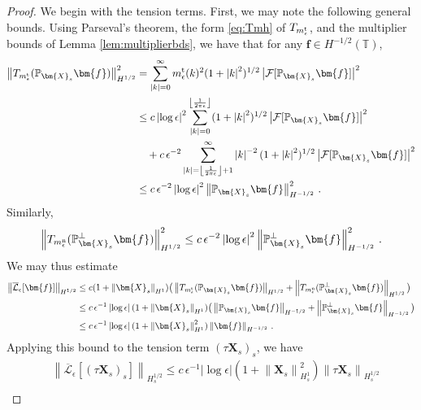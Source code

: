 \documentclass[11pt,reqno]{amsart}
\newcommand{\T}{\mathbb{T}}
\renewcommand{\P}{\mathbb{P}}
\newcommand{\X}{\bm{X}}
\newcommand{\abs}[1]{\left\lvert #1 \right\rvert}
\newcommand{\norm}[1]{\left\lVert #1 \right\rVert}
\newcommand{\floor}[1]{\left\lfloor #1 \right\rfloor}
\newcommand{\mc}[1]{\mathcal{#1}}
\numberwithin{equation}{section}
\theoremstyle{definition}
\begin{document}
\begin{proof}
We begin with the tension terms. First, we may note the following general bounds. Using Parseval's theorem, the form \eqref{eq:Tmh} of $T_{m_\epsilon^{\rm t}}$, and the multiplier bounds of Lemma \ref{lem:multiplierbds}, we have that for any $\bm{f}\in H^{-1/2}(\T)$,
 \begin{equation}
 \begin{aligned}
   \norm{T_{m_\epsilon^{\rm t}}(\P_{\X_s}\bm{f})}_{H^{1/2}}^2 &= \sum_{\abs{k}=0}^\infty m_\epsilon^{\rm t}(k)^2(1+\abs{k}^2)^{1/2}\abs{\mc{F}[\P_{\X_s}\bm{f}]}^2\\
   &\le c\abs{\log\epsilon}^2\sum_{\abs{k}=0}^{\floor{\frac{1}{2\pi\epsilon}}} (1+\abs{k}^2)^{1/2}\abs{\mc{F}[\P_{\X_s}\bm{f}]}^2 \\
   &\quad + c\,\epsilon^{-2}\sum_{\abs{k}=\floor{\frac{1}{2\pi\epsilon}}+1}^\infty \abs{k}^{-2}(1+\abs{k}^2)^{1/2}\abs{\mc{F}[\P_{\X_s}\bm{f}]}^2\\
   &\le c\,\epsilon^{-2}\abs{\log\epsilon}^2\norm{\P_{\X_s}\bm{f}}_{H^{-1/2}}^2\,.
 \end{aligned}
 \end{equation}
 Similarly,
  \begin{equation}
   \norm{T_{m_\epsilon^{\rm n}}(\P_{\X_s}^\perp\bm{f})}_{H^{1/2}}^2 
   \le c\,\epsilon^{-2}\abs{\log\epsilon}^2\norm{\P_{\X_s}^\perp\bm{f}}_{H^{-1/2}}^2\,.
 \end{equation}
We may thus estimate
 \begin{equation}
\begin{aligned}
   \norm{\overline{\mc{L}}_\epsilon[\bm{f}]}_{H^{1/2}}
   &\le c(1+\norm{\X_s}_{H^1})\big(\norm{T_{m_\epsilon^{\rm t}}(\P_{\X_s}\bm{f})}_{H^{1/2}} +\norm{T_{m_\epsilon^{\rm n}}(\P_{\X_s}^\perp\bm{f})}_{H^{1/2}} \big)\\
   &\le c\,\epsilon^{-1}\abs{\log\epsilon}(1+\norm{\X_s}_{H^1})\big(\norm{\P_{\X_s}\bm{f}}_{H^{-1/2}}+\norm{\P_{\X_s}^\perp\bm{f}}_{H^{-1/2}}\big)\\
   &\le c\,\epsilon^{-1}\abs{\log\epsilon}(1+\norm{\X_s}_{H^1}^2)\norm{\bm{f}}_{H^{-1/2}}\,.
  \end{aligned}
 \end{equation}  
%
%
Applying this bound to the tension term $(\tau\X_s)_s$, we have 
\begin{equation}
\begin{aligned}
   &\norm{\overline{\mc{L}}_\epsilon[(\tau\X_s)_s]}_{H^{1/2}_s}
   \le c\,\epsilon^{-1}\abs{\log\epsilon}(1+\norm{\X_s}_{H^1_s}^2)\norm{\tau\X_s}_{H^{1/2}_s}\\

\end{aligned}
\end{equation}
\end{proof}
\end{document}
